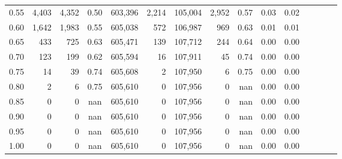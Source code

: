 \begin{tabular}{rrrcrrrrrrrrrrr}
0.55 &    4,403 &   4,352 &                                       0.50 &  603,396 &    2,214 &  105,004 &    2,952 &  0.57 &  0.03 &                         0.02 \\
0.60 &    1,642 &   1,983 &                                       0.55 &  605,038 &      572 &  106,987 &      969 &  0.63 &  0.01 &                         0.01 \\
0.65 &      433 &     725 &                                       0.63 &  605,471 &      139 &  107,712 &      244 &  0.64 &  0.00 &                         0.00 \\
0.70 &      123 &     199 &                                       0.62 &  605,594 &       16 &  107,911 &       45 &  0.74 &  0.00 &                         0.00 \\
0.75 &       14 &      39 &                                       0.74 &  605,608 &        2 &  107,950 &        6 &  0.75 &  0.00 &                         0.00 \\
0.80 &        2 &       6 &                                       0.75 &  605,610 &        0 &  107,956 &        0 &   nan &  0.00 &                         0.00 \\
0.85 &        0 &       0 &                                        nan &  605,610 &        0 &  107,956 &        0 &   nan &  0.00 &                         0.00 \\
0.90 &        0 &       0 &                                        nan &  605,610 &        0 &  107,956 &        0 &   nan &  0.00 &                         0.00 \\
0.95 &        0 &       0 &                                        nan &  605,610 &        0 &  107,956 &        0 &   nan &  0.00 &                         0.00 \\
1.00 &        0 &       0 &                                        nan &  605,610 &        0 &  107,956 &        0 &   nan &  0.00 &                         0.00 \\
\bottomrule
\end{tabular}
